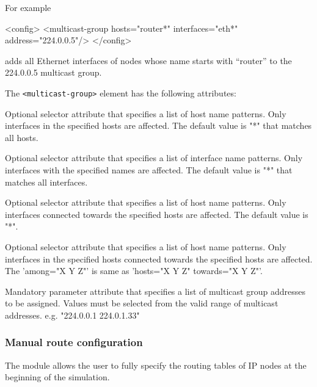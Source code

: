 For example
\begin{XML}
<config>
  <multicast-group hosts="router*" interfaces="eth*" address="224.0.0.5"/>
</config>
\end{XML}
adds all Ethernet interfaces of nodes whose name starts with ``router''
to the 224.0.0.5 multicast group.

The \verb!<multicast-group>! element has the following attributes:
\begin{compactitem}
    \item {}
      Optional selector attribute that specifies a list of host name patterns.
      Only interfaces in the specified hosts are affected. The default value
      is "*" that matches all hosts.

    \item {}
      Optional selector attribute that specifies a list of interface name
      patterns. Only interfaces with the specified names are affected. The
      default value is "*" that matches all interfaces.

    \item {}
      Optional selector attribute that specifies a list of host name patterns.
      Only interfaces connected towards the specified hosts are affected.
      The default value is "*".

    \item {}
      Optional selector attribute that specifies a list of host name patterns.
      Only interfaces in the specified hosts connected towards the specified
      hosts are affected.
      The 'among="X Y Z"' is same as 'hosts="X Y Z" towards="X Y Z"'.

    \item {}
      Mandatory parameter attribute that specifies a list of multicast group
      addresses to be assigned. Values must be selected from the valid range
      of multicast addresses.
      e.g. "224.0.0.1 224.0.1.33"
\end{compactitem}


\subsubsection*{Manual route configuration}

The  module allows the user
to fully specify the routing tables of IP nodes at the beginning
of the simulation.


